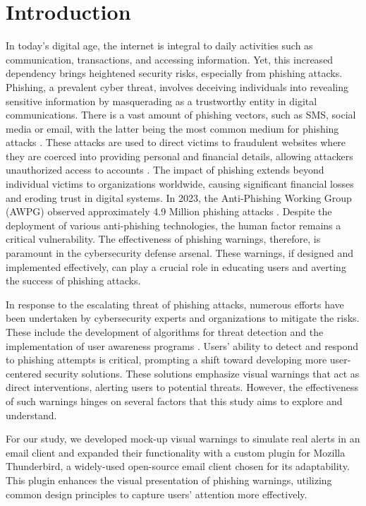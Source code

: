 \documentclass[
  a4paper,  %
  twoside,  %
  bibliography=totoc,
  headsepline,
  cleardoublepage=empty,
  parskip=half,
  draft=false
]{scrbook}
\begin{document}
\chapter{Introduction}
\label{sec:introduction}
In today's digital age, the internet is integral to daily activities such as communication, transactions, and accessing information. Yet, this increased dependency brings heightened security risks, especially from phishing attacks. Phishing, a prevalent cyber threat, involves deceiving individuals into revealing sensitive information by masquerading as a trustworthy entity in digital communications. There is a vast amount of phishing vectors, such as SMS, social media or email, with the latter being the most common medium for phishing attacks \cite{verizon}. These attacks are used to direct victims to fraudulent websites where they are coerced into providing personal and financial details, allowing attackers unauthorized access to accounts \cite{Wang2012}. \newline 
The impact of phishing extends beyond individual victims to organizations worldwide, causing significant financial losses and eroding trust in digital systems. In 2023, the Anti-Phishing Working Group (AWPG) observed approximately 4.9 Million phishing attacks \cite{apwg}. Despite the deployment of various anti-phishing technologies, the human factor remains a critical vulnerability. The effectiveness of phishing warnings, therefore, is paramount in the cybersecurity defense arsenal. These warnings, if designed and implemented effectively, can play a crucial role in educating users and averting the success of phishing attacks. \par
In response to the escalating threat of phishing attacks, numerous efforts have been undertaken by cybersecurity experts and organizations to mitigate the risks. These include the development of algorithms for threat detection \cite{thakur} and the implementation of user awareness programs \cite{jampen}. Users' ability to detect and respond to phishing attempts is critical, prompting a shift toward developing more user-centered security solutions. These solutions emphasize visual warnings that act as direct interventions, alerting users to potential threats. However, the effectiveness of such warnings hinges on several factors that this study aims to explore and understand. \par
For our study, we developed mock-up visual warnings to simulate real alerts in an email client and expanded their functionality with a custom plugin for Mozilla Thunderbird, a widely-used open-source email client chosen for its adaptability. This plugin enhances the visual presentation of phishing warnings, utilizing common design principles to capture users' attention more effectively. \newline
\end{document}
